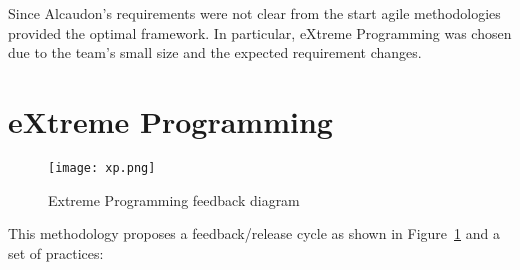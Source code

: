 Since Alcaudon's requirements were not clear from the start agile methodologies
provided the optimal framework. In particular, eXtreme Programming was chosen
due to the team's small size and the expected requirement changes.

\section{eXtreme Programming}

\begin{figure}
  \centering
  \texttt{[image: xp.png]}
  \caption{Extreme Programming feedback diagram\cite{xp}}
  \label{fig:xp}
\end{figure}

This methodology proposes a feedback/release cycle as shown in Figure~\ref{fig:xp} and a set of
practices\cite{xp}:

